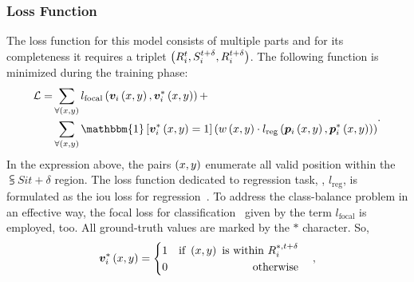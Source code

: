 \subsubsection{Loss Function}

The loss function for this model consists of multiple parts and for its completeness it requires a triplet $\left( {{R}_{i}^{t}, {S}_{i}^{t + \delta}, {R}_{i}^{t + \delta}} \right)$. The following function is minimized during the training phase:
\begin{equation}
    \begin{aligned}
        \lossf =
         & \sum_{\forall \rbrackets{x, y}}
        \func{l_{\text{focal}}}{
            \func{\mtxsub{v}{i}}{
                x, y
            },
            \func{\mtxsubsup{v}{i}{*}}{
                x, y
            }
        } +                                \\
         & \sum_{\forall \rbrackets{x, y}}
        \mathbbm{1}
        \sbrackets{
            \func{\mtxsubsup{v}{i}{*}}{
                x, y
            } = 1
        }
        \rbrackets{
            \func{w}{x, y}
            \cdot
            \func{l_{\text{reg}}}{
                \func{\mtxsub{p}{i}}{x, y},
                \func{\mtxsubsup{p}{i}{*}}{x, y}
            }
        }
    \end{aligned}.
\end{equation}
In the expression above, the pairs $\left( {x, y} \right)$ enumerate all valid position within the $\subsup{S}{i}{t + \delta}$ region. The loss function dedicated to regression task, \ietext{}, $l_{\text{reg}}$, is formulated as the \gls{iou} loss for regression~\cite{danelljan2019atom, yu2016unitbox}. To address the class-balance problem in an effective way, the focal loss for classification~\cite{lin2018focal} given by the term $l_{\text{focal}}$ is employed, too. All ground-truth values are marked by the $*$ character. So,
\begin{equation}
    {\bm{v}_{i}^{*}} \left( x, y \right) =
    \begin{cases}
        \begin{aligned}
             & 1 & \text{if } \left( {x, y} \right) \text{ is within } {R}_{i}^{*, t + \delta} \\
             & 0 & \text{otherwise}                                                            \\
        \end{aligned}
    \end{cases},
\end{equation}

